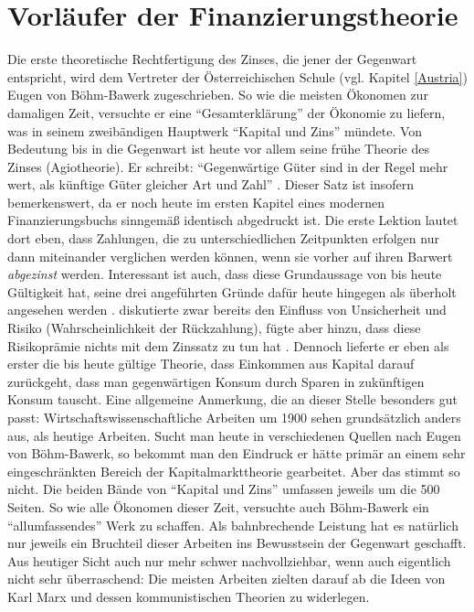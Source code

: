 \section{Vorläufer der Finanzierungstheorie}
\label{FisherundKnight}

Die erste theoretische Rechtfertigung des Zinses, die jener der Gegenwart entspricht, wird dem Vertreter der Österreichischen Schule (vgl. Kapitel \ref{Austria}) Eugen von Böhm-Bawerk zugeschrieben. So wie die meisten Ökonomen zur damaligen Zeit, versuchte er eine "`Gesamterklärung"' der Ökonomie zu liefern, was in seinem zweibändigen Hauptwerk "`Kapital und Zins"' mündete. Von Bedeutung bis in die Gegenwart ist heute vor allem seine frühe Theorie des Zinses (Agiotheorie). Er schreibt: "`Gegenwärtige Güter sind in der Regel mehr wert, als künftige Güter gleicher Art und Zahl"' \parencite[S. 248]{BohmBawerk1888}. Dieser Satz ist insofern bemerkenswert, da er noch heute im ersten Kapitel eines modernen Finanzierungsbuchs sinngemäß identisch abgedruckt ist. Die erste Lektion lautet dort eben, dass Zahlungen, die zu unterschiedlichen Zeitpunkten erfolgen nur dann miteinander verglichen werden können, wenn sie vorher auf ihren Barwert \textit{abgezinst} werden. Interessant ist auch, dass diese Grundaussage von \textcite{BohmBawerk1888} bis heute Gültigkeit hat, seine drei angeführten Gründe dafür heute hingegen als überholt angesehen werden \parencite[S. 316]{Rosner2012}. \textcite[S. 258ff]{BohmBawerk1888} diskutierte zwar bereits den Einfluss von Unsicherheit und Risiko (Wahrscheinlichkeit der Rückzahlung), fügte aber hinzu, dass diese Risikoprämie nichts mit dem Zinssatz zu tun hat \parencite[S. 261]{BohmBawerk1888}. Dennoch lieferte er eben als erster die bis heute gültige Theorie, dass Einkommen aus Kapital darauf zurückgeht, dass man gegenwärtigen Konsum durch Sparen in zukünftigen Konsum tauscht. Eine allgemeine Anmerkung, die an dieser Stelle besonders gut passt: Wirtschaftswissenschaftliche Arbeiten um 1900 sehen grundsätzlich anders aus, als heutige Arbeiten. Sucht man heute in verschiedenen Quellen nach Eugen von Böhm-Bawerk, so bekommt man den Eindruck er hätte primär an einem sehr eingeschränkten Bereich der Kapitalmarkttheorie gearbeitet. Aber das stimmt so nicht. Die beiden Bände von "`Kapital und Zins"' umfassen jeweils um die 500 Seiten. So wie alle Ökonomen dieser Zeit, versuchte auch Böhm-Bawerk ein "`allumfassendes"' Werk zu schaffen. Als bahnbrechende Leistung hat es natürlich nur jeweils ein Bruchteil dieser Arbeiten ins Bewusstsein der Gegenwart geschafft. Aus heutiger Sicht auch nur mehr schwer nachvollziehbar, wenn auch eigentlich nicht sehr überraschend: Die meisten Arbeiten zielten darauf ab die Ideen von Karl Marx und dessen kommunistischen Theorien zu widerlegen. 

